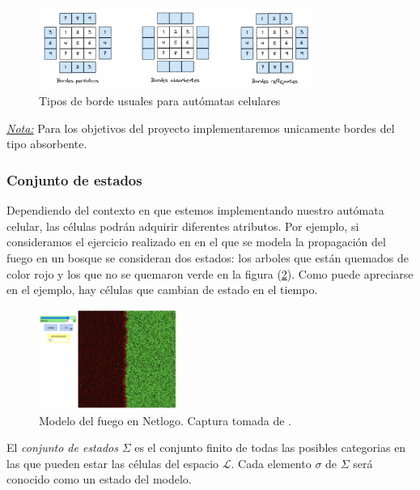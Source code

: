\begin{figure}[h]
  \centering
    \includegraphics[width=0.8\textwidth]{Imagenes/Tipos_de_borde.PNG}
  \caption{Tipos de borde usuales para autómatas celulares}
  \label{fig:Tipos de borde}
\end{figure}
    
\underline{\textit{Nota:}} Para los objetivos del proyecto implementaremos unicamente bordes del tipo absorbente.

\subsubsection{Conjunto de estados}

Dependiendo del contexto en que estemos implementando nuestro autómata celular, las células podrán adquirir diferentes atributos. Por ejemplo, si consideramos el ejercicio realizado en  \cite{NetLogoFireModel} en el que se modela la propagación del fuego en un bosque se consideran dos estados: los arboles que están quemados de color rojo y los que no se quemaron verde en la figura (\ref{fig:Fuego Netlogo}). Como puede apreciarse en el ejemplo, hay células que cambian de estado en el tiempo.

\begin{figure}[h]
  \centering
    \includegraphics[width=0.4\textwidth]{Imagenes/netlogoEx1.PNG}
  \caption{Modelo del fuego en Netlogo. Captura tomada de \cite{NetLogoFireModel}.}
  \label{fig:Fuego Netlogo}
\end{figure}

\begin{definition}\label{conjuntoDeEstados}
El \textit{conjunto de estados} $\Sigma$ es el conjunto finito de todas las posibles categorias en las que pueden estar las células del espacio $\mathcal{L}$. Cada elemento $\sigma$ de $\Sigma$ será conocido como un estado del modelo.
\end{definition}

